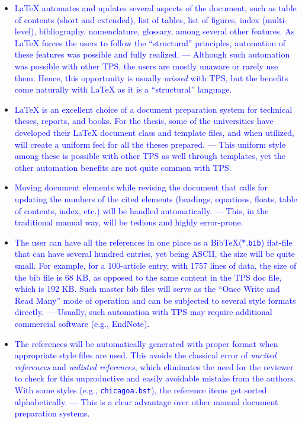 \documentclass[phd,showframe]{ndsu-thesis-2022}
\newcommand\italk[1]{\textcolor{blue}{#1}}  %
\newcommand\lx{\LaTeX\xspace}
\newcommand\bx{Bib\!\TeX\xspace}
\newcommand\vb[1]{\textcolor{blue}{\texttt{#1}}}%
\begin{document}
\begin{itemize}[leftmargin=*, itemsep=0pt, parsep=3pt]
\item \italk{\lx automates and updates several aspects of the document, such as table of contents (short and extended), list of tables, list of figures, index (multi-level), bibliography, nomenclature, glossary, among several other features. As \lx forces the users to follow the ``structural'' principles, automation of these features was possible and fully realized. --- Although such automation was possible with other TPS, the users are mostly unaware or rarely use them. Hence, this opportunity is usually \emph{missed} with TPS, but the benefits come naturally with \lx as it is a ``structural'' language.}

\item \italk{\lx is an excellent choice of a document preparation system for technical theses, reports, and books.  For the thesis, some of the universities have developed their \lx document class and template files, and when utilized, will create a uniform feel for all the theses prepared. --- This uniform style among these is possible with other TPS as well through templates, yet the other automation benefits are not quite common with TPS.}  

\item \italk{Moving document elements while revising the document that calls for updating the numbers of the cited elements (headings, equations, floats, table of contents, index, etc.) will be handled automatically. --- This, in the traditional manual way, will be tedious and highly error-prone.}   

\item \italk{The user can have all the references in one place as a \bx  ($\ast$.\vb{bib}) flat-file that can have several hundred entries, yet being ASCII, the size will be quite small. For example, for a 100-article entry, with 1757 lines of data, the size of the bib file is 68 KB, as opposed to the same content in the TPS doc file, which is 192 KB. Such master bib files will serve as the ``Once Write and Read Many'' mode of operation and can be subjected to several style formats directly. --- Usually, such automation with TPS may require additional commercial software (e.g., EndNote).} 

\item \italk{The references will be automatically generated with proper format when appropriate style files are used. This avoids the classical error of \emph{uncited references} and \emph{unlisted references}, which eliminates the need for the reviewer to check for this unproductive and easily avoidable mistake from the authors.  With some styles (e.g., \vb{chicagoa.bst}), the reference items get sorted alphabetically. --- This is a clear advantage over other manual document preparation systems.}   


\end{itemize}
\end{document}
